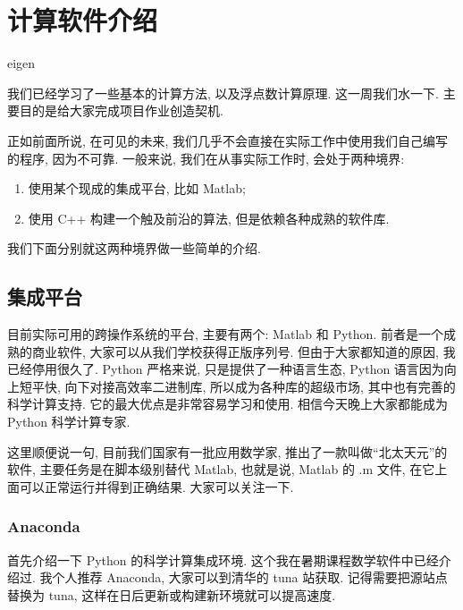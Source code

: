 \documentclass[a4paper]{ctexart}
\begin{document}
{%



\section*{计算软件介绍}

eigen

我们已经学习了一些基本的计算方法, 以及浮点数计算原理. 这一周我们水一下.
主要目的是给大家完成项目作业创造契机.

正如前面所说, 在可见的未来, 我们几乎不会直接在实际工作中使用我们自己编写的程序,
因为不可靠. 一般来说, 我们在从事实际工作时, 会处于两种境界:

\begin{enumerate}
\item 使用某个现成的集成平台, 比如 Matlab;
\item 使用 C++ 构建一个触及前沿的算法, 但是依赖各种成熟的软件库.
\end{enumerate}

我们下面分别就这两种境界做一些简单的介绍.

\subsection*{集成平台}
目前实际可用的跨操作系统的平台, 主要有两个: Matlab 和 Python. 前者是一个成熟的商业软件,
大家可以从我们学校获得正版序列号. 但由于大家都知道的原因, 我已经停用很久了. Python 严格来说,
只是提供了一种语言生态, Python 语言因为向上短平快, 向下对接高效率二进制库,
所以成为各种库的超级市场, 其中也有完善的科学计算支持. 它的最大优点是非常容易学习和使用.
相信今天晚上大家都能成为 Python 科学计算专家.

这里顺便说一句, 目前我们国家有一批应用数学家, 推出了一款叫做``北太天元''的软件,
主要任务是在脚本级别替代 Matlab, 也就是说, Matlab 的 .m 文件, 在它上面可以正常运行并得到正确结果.
大家可以关注一下.

\subsubsection*{Anaconda}
首先介绍一下 Python 的科学计算集成环境. 这个我在暑期课程数学软件中已经介绍过. 我个人推荐
Anaconda, 大家可以到清华的 tuna 站获取. 记得需要把源站点替换为 tuna,
这样在日后更新或构建新环境就可以提高速度.

}
\end{document}
